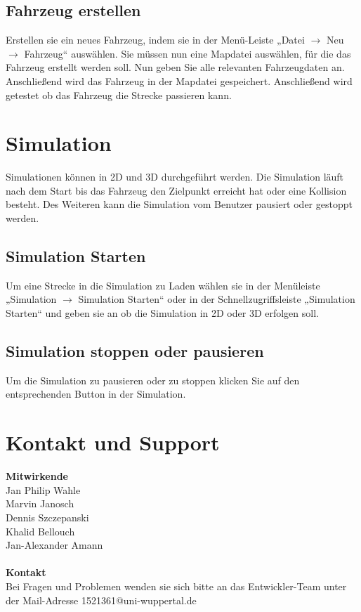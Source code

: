 \documentclass[11pt,a4paper]{article}
\begin{document}
\subsection{Fahrzeug erstellen}
Erstellen sie ein neues Fahrzeug, indem sie in der Menü-Leiste „Datei $\rightarrow$ Neu $\rightarrow$ Fahrzeug“ auswählen. Sie müssen nun eine Mapdatei auswählen, für die das Fahrzeug erstellt werden soll. Nun geben Sie alle relevanten Fahrzeugdaten an. Anschließend wird das Fahrzeug in der Mapdatei gespeichert. Anschließend wird getestet ob das Fahrzeug die Strecke passieren kann.
\newpage
\section{Simulation}
Simulationen können in 2D und 3D durchgeführt werden. Die Simulation läuft nach dem Start bis das Fahrzeug den Zielpunkt erreicht hat oder eine Kollision besteht.
Des Weiteren kann die Simulation vom Benutzer pausiert oder gestoppt werden.

\subsection{Simulation Starten}
Um eine Strecke in die Simulation zu Laden wählen sie in der Menüleiste „Simulation $\rightarrow$ Simulation Starten“ oder in der Schnellzugriffsleiste „Simulation Starten“ und geben sie an ob die Simulation in 2D oder 3D erfolgen soll.
\subsection{Simulation stoppen oder pausieren}
Um die Simulation zu pausieren oder zu stoppen klicken Sie auf den entsprechenden Button in der Simulation.
\newpage
\section{Kontakt und Support}
\textbf{Mitwirkende} \\ 
Jan Philip Wahle \\
Marvin Janosch \\
Dennis Szczepanski \\
Khalid Bellouch \\
Jan-Alexander Amann \\
\\
\textbf{Kontakt} \\ 
Bei Fragen und Problemen wenden sie sich bitte an das Entwickler-Team unter der Mail-Adresse 1521361@uni-wuppertal.de
\end{document}

